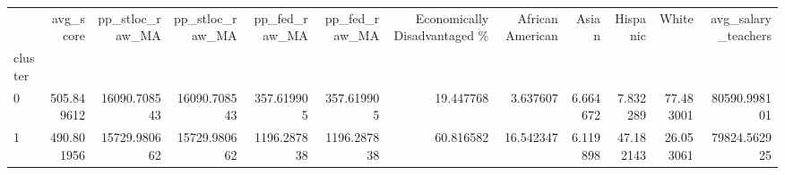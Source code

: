 \begin{tabular}{lrrrrrrrrrrr}
\toprule
{} &   avg\_score &  pp\_stloc\_raw\_MA &  pp\_stloc\_raw\_MA &  pp\_fed\_raw\_MA &  pp\_fed\_raw\_MA &  Economically Disadvantaged \% &  African American &     Asian &   Hispanic &      White &  avg\_salary\_teachers \\
cluster &             &                  &                  &                &                &                               &                   &           &            &            &                      \\
\midrule
0       &  505.849612 &     16090.708543 &     16090.708543 &     357.619905 &     357.619905 &                     19.447768 &          3.637607 &  6.664672 &   7.832289 &  77.483001 &         80590.998101 \\
1       &  490.801956 &     15729.980662 &     15729.980662 &    1196.287838 &    1196.287838 &                     60.816582 &         16.542347 &  6.119898 &  47.182143 &  26.053061 &         79824.562925 \\
\bottomrule
\end{tabular}
